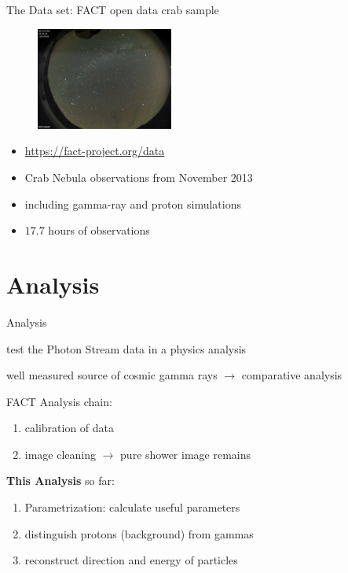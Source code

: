 \begin{frame}[t]{The Data set: FACT open data crab sample}
    \begin{multicols}{2}
        \begin{figure}
            \centering
            \includegraphics[width=0.4\textwidth]{fig/cond.png}
        \end{figure}
    \columnbreak
    \vspace*{\fill}
        \begin{itemize}
            \item \url{https://fact-project.org/data}
            \item Crab Nebula observations from November 2013
            \item including gamma-ray and proton simulations
            \item $17.7$ hours of observations
        \end{itemize}
    \vspace*{\fill}
  \end{multicols}
\end{frame}

\section{Analysis}

\begin{frame}[t]{Analysis}
\begin{description}
    \item[aim] test the Photon Stream data in a physics analysis 
    \item[Crab Nebula] well measured source of cosmic gamma rays $\rightarrow$ comparative analysis
\end{description}
FACT Analysis chain:
    \begin{enumerate}
        \item calibration of data
        \item image cleaning $\rightarrow$ pure shower image remains
    \end{enumerate}
\textbf{{\color{tugreen} This Analysis}} so far:
    \begin{enumerate}\addtocounter{enumi}{2}
        \item Parametrization: calculate useful parameters
        \item distinguish protons (background) from gammas
        \item reconstruct direction and energy of particles
    \end{enumerate}
\end{frame}

